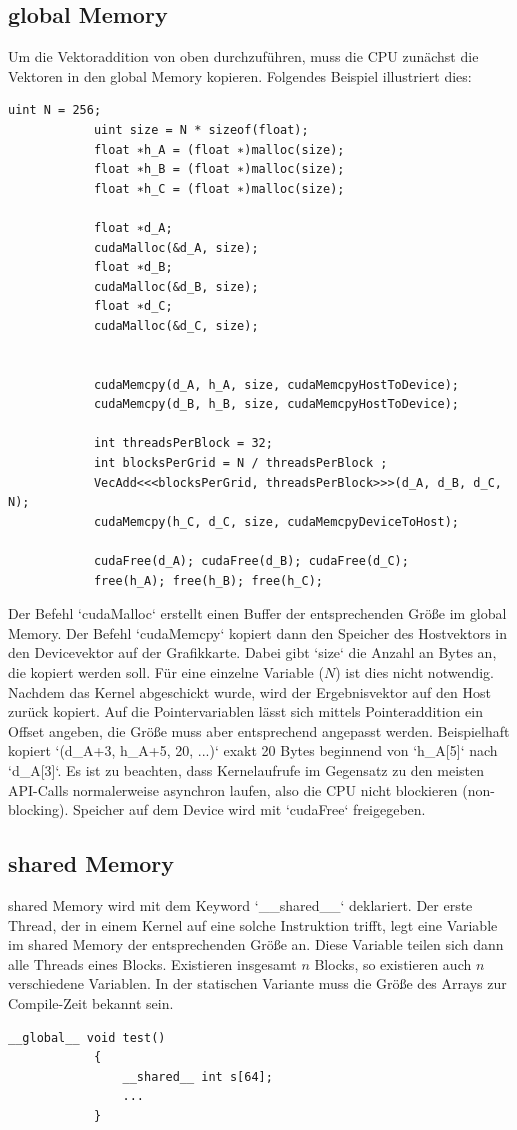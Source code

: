 		\newpage
		
		\subsection{global Memory}
		Um die Vektoraddition von oben durchzuführen, muss die CPU zunächst die Vektoren in den \Gls{global Memory} kopieren. Folgendes Beispiel illustriert dies:		
		\begin{lstlisting}[caption=Vektoraddition Host]
			uint N = 256;
			uint size = N * sizeof(float);
			float ∗h_A = (float ∗)malloc(size);
			float ∗h_B = (float ∗)malloc(size);
			float ∗h_C = (float ∗)malloc(size);

			float ∗d_A;
			cudaMalloc(&d_A, size);
			float ∗d_B;
			cudaMalloc(&d_B, size);
			float ∗d_C;
			cudaMalloc(&d_C, size);
			
			
			cudaMemcpy(d_A, h_A, size, cudaMemcpyHostToDevice);
			cudaMemcpy(d_B, h_B, size, cudaMemcpyHostToDevice);

			int threadsPerBlock = 32;
			int blocksPerGrid = N / threadsPerBlock ;
			VecAdd<<<blocksPerGrid, threadsPerBlock>>>(d_A, d_B, d_C, N);
			cudaMemcpy(h_C, d_C, size, cudaMemcpyDeviceToHost);
			
			cudaFree(d_A); cudaFree(d_B); cudaFree(d_C);
			free(h_A); free(h_B); free(h_C);
		\end{lstlisting}	
		
		Der Befehl \li`cudaMalloc` erstellt einen Buffer der entsprechenden Größe im \Gls{global Memory}.
		Der Befehl \li`cudaMemcpy` kopiert dann den Speicher des Hostvektors in den Devicevektor auf der Grafikkarte. Dabei gibt \li`size` die Anzahl an Bytes an, die kopiert werden soll. Für eine einzelne Variable ($N$) ist dies nicht notwendig.
		Nachdem das Kernel abgeschickt wurde, wird der Ergebnisvektor auf den Host zurück kopiert. Auf die Pointervariablen lässt sich mittels Pointeraddition ein Offset angeben, die Größe muss aber entsprechend angepasst werden. Beispielhaft kopiert \li`(d_A+3, h_A+5, 20, ...)` exakt 20 Bytes beginnend von \li`h_A[5]` nach \li`d_A[3]`.
		Es ist zu beachten, dass \Gls{Kernel}aufrufe im Gegensatz zu den meisten \Gls{API}-Calls normalerweise asynchron laufen, also die CPU nicht blockieren (non-blocking). 
		Speicher auf dem Device wird mit \li`cudaFree` freigegeben.
		
		\subsection{shared Memory}
		\Gls{shared Memory} wird mit dem Keyword \li`__shared__` deklariert. Der erste \Gls{Thread}, der in einem \Gls{Kernel} auf eine solche Instruktion trifft, legt eine Variable im \gls{shared Memory} der entsprechenden Größe an. Diese Variable teilen sich dann alle \Glspl{Thread} eines \Gls{Block}s. Existieren insgesamt $n$ \Glspl{Block}, so existieren auch $n$ verschiedene Variablen. In der statischen Variante muss die Größe des Arrays zur Compile-Zeit bekannt sein.
		\begin{lstlisting}[caption=shared Memory statisch]
			__global__ void test()
			{
  				__shared__ int s[64];
  				...
			}
  		\end{lstlisting}

